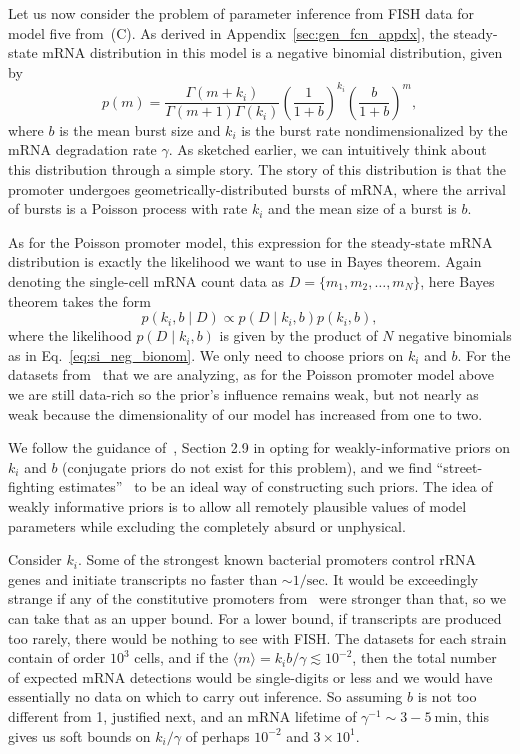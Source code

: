 Let us now consider the problem of parameter inference from FISH data for model
five from~(C). As derived in
Appendix~\ref{sec:gen_fcn_appdx}, the steady-state mRNA distribution in this
model is a negative binomial distribution, given by
\begin{equation}
p(m) = \frac{\Gamma(m+k_i)}{\Gamma(m+1)\Gamma(k_i)}
        \left(\frac{1}{1+b}\right)^{k_i}
        \left(\frac{b}{1+b}\right)^m,
\label{eq:si_neg_bionom}
\end{equation}
where $b$ is the mean burst size and $k_i$ is the burst rate nondimensionalized
by the mRNA degradation rate $\gamma$. As sketched earlier, we can intuitively
think about this distribution through a simple story. The story of this
distribution is that the promoter undergoes geometrically-distributed bursts of
mRNA, where the arrival of bursts is a Poisson process with rate $k_i$ and the
mean size of a burst is $b$.

As for the Poisson promoter model, this expression for the steady-state mRNA
distribution is exactly the likelihood we want to use in Bayes theorem. Again
denoting the single-cell mRNA count data as $D=\{m_1, m_2,\dots, m_N\}$, here
Bayes theorem takes the form
\begin{equation}
p(k_i, b \mid D) \propto p(D\mid k_i,b)p(k_i, b),
\end{equation}
where the likelihood $p(D\mid k_i,b)$ is given by the product of $N$ negative
binomials as in Eq.~\ref{eq:si_neg_bionom}. We only need to choose priors on
$k_i$ and $b$. For the datasets from~\cite{Jones2014} that we are analyzing, as
for the Poisson promoter model above we are still data-rich so the prior's
influence remains weak, but not nearly as weak because the dimensionality of our
model has increased from one to two.

We follow the guidance of~\cite{Gelman2013}, Section 2.9 in opting for
weakly-informative priors on $k_i$ and $b$ (conjugate priors do not exist for
this problem), and we find ``street-fighting estimates''~\cite{Mahajan2010} to
be an ideal way of constructing such priors. The idea of weakly informative
priors is to allow all remotely plausible values of model parameters while
excluding the completely absurd or unphysical.

Consider $k_i$. Some of the strongest known bacterial promoters control rRNA
genes and initiate transcripts no faster than $\sim 1/\text{sec}$. It would be
exceedingly strange if any of the constitutive promoters from~\cite{Jones2014}
were stronger than that, so we can take that as an upper bound. For a lower
bound, if transcripts are produced too rarely, there would be nothing to see
with FISH. The datasets for each strain contain of order $10^3$ cells, and if
the $\langle m \rangle = k_i b/\gamma \lesssim 10^{-2}$, then the total number
of expected mRNA detections would be single-digits or less and we would have
essentially no data on which to carry out inference. So assuming $b$ is not too
different from 1, justified next, and an mRNA lifetime of $\gamma^{-1}\sim
3-5~\text{min}$, this gives us soft bounds on $k_i/\gamma$ of perhaps $10^{-2}$
and $3\times 10^1$.

